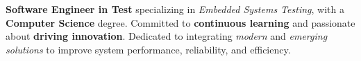 \par{
  \textbf{Software Engineer in Test} specializing in \textit{Embedded Systems Testing}, with a \textbf{Computer Science} degree. Committed to \textbf{continuous learning} and passionate about \textbf{driving innovation}. Dedicated to integrating \textit{modern} and \textit{emerging solutions} to improve system performance, reliability, and efficiency.
}
